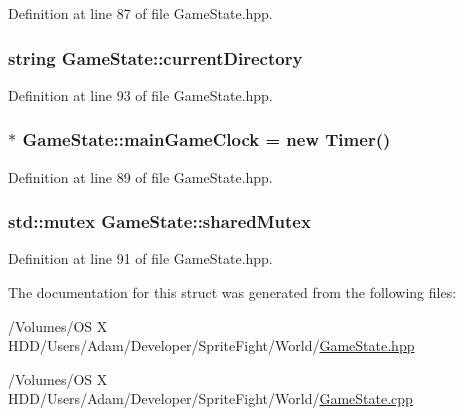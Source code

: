 Definition at line 87 of file Game\-State.\-hpp.

\hypertarget{struct_game_state_a0aad2a1111325f0345a511fe1665800a}{
\subsubsection[{current\-Directory}]{\setlength{\rightskip}{0pt plus 5cm}string Game\-State\-::current\-Directory\hspace{0.3cm}{\ttfamily [static]}}}\label{struct_game_state_a0aad2a1111325f0345a511fe1665800a}


Definition at line 93 of file Game\-State.\-hpp.

\hypertarget{struct_game_state_a5e5f91123aacc5e7fa22ddefdb3cd256}{
\subsubsection[{main\-Game\-Clock}]{ $\ast$ Game\-State\-::main\-Game\-Clock = new {\bf Timer}()\hspace{0.3cm}{\ttfamily [static]}}}\label{struct_game_state_a5e5f91123aacc5e7fa22ddefdb3cd256}


Definition at line 89 of file Game\-State.\-hpp.

\hypertarget{struct_game_state_a0d889afebf6eea90f6d3212c29cf7451}{
\subsubsection[{shared\-Mutex}]{\setlength{\rightskip}{0pt plus 5cm}std\-::mutex Game\-State\-::shared\-Mutex\hspace{0.3cm}{\ttfamily [static]}}}\label{struct_game_state_a0d889afebf6eea90f6d3212c29cf7451}


Definition at line 91 of file Game\-State.\-hpp.



The documentation for this struct was generated from the following files\-:\begin{DoxyCompactItemize}
\item 
/\-Volumes/\-O\-S X H\-D\-D/\-Users/\-Adam/\-Developer/\-Sprite\-Fight/\-World/\hyperlink{_game_state_8hpp}{Game\-State.\-hpp}\item 
/\-Volumes/\-O\-S X H\-D\-D/\-Users/\-Adam/\-Developer/\-Sprite\-Fight/\-World/\hyperlink{_game_state_8cpp}{Game\-State.\-cpp}\end{DoxyCompactItemize}
